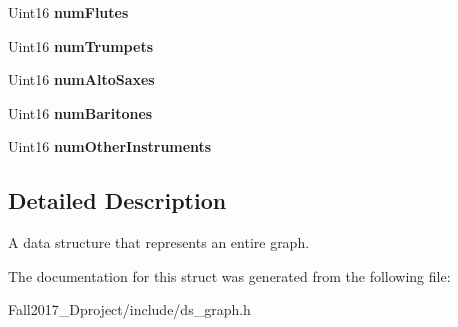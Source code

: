 \begin{DoxyCompactItemize}
Uint16 {\bfseries num\+Flutes}
\item 
\mbox{\label{structgraph__s_a548182b3e70187deb4cfc0dc43c15978}} 
Uint16 {\bfseries num\+Trumpets}
\item 
\mbox{\label{structgraph__s_a0afe5a0ad698dfe5256d7ce8b7ea36cd}} 
Uint16 {\bfseries num\+Alto\+Saxes}
\item 
\mbox{\label{structgraph__s_a563f8acda584a9310a41aef33c53e3a3}} 
Uint16 {\bfseries num\+Baritones}
\item 
\mbox{\label{structgraph__s_a46dc033abc8e94141c68f355d00bf846}} 
Uint16 {\bfseries num\+Other\+Instruments}
\end{DoxyCompactItemize}


\subsection{Detailed Description}
A data structure that represents an entire graph. 

The documentation for this struct was generated from the following file\+:\begin{DoxyCompactItemize}
\item 
Fall2017\+\_\+Dproject/include/ds\+\_\+graph.\+h\end{DoxyCompactItemize}
